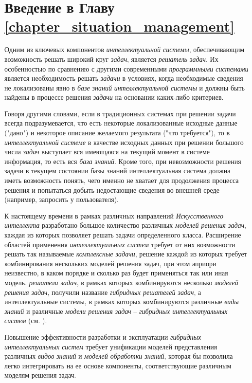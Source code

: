 \section*{Введение в Главу \ref{chapter_situation_management}}

Одним из ключевых компонентов \textit{интеллектуальной системы}, обеспечивающим возможность решать широкий круг \textit{задач}, является \textit{решатель задач}. Их особенностью по сравнению с другими современными \textit{программными системами} является необходимость решать \textit{задачи} в условиях, когда необходимые сведения не локализованы явно в \textit{базе знаний} \textit{интеллектуальной системы} и должны быть найдены в процессе решения \textit{задачи} на основании каких-либо критериев. 

Говоря другими словами, если в традиционных системах при решении задачи всегда подразумевается, что есть некоторые локализованные исходные данные ("дано") и некоторое описание желаемого результата ("что требуется"), то в \textit{интеллектуальной системе} в качестве исходных данных при решении большого числа \textit{задач} выступает вся имеющаяся на текущий момент в системе информация, то есть вся \textit{база знаний}. Кроме того, при невозможности решения задачи в текущем состоянии базы знаний интеллектуальная система должна иметь возможность понять, чего именно не хватает для продолжения процесса решения и попытаться добыть недостающие сведения во внешней среде (например, запросить у пользователя).

К настоящему времени в рамках различных направлений \textit{Искусственного интеллекта} разработано большое количество различных \textit{моделей решения задач}, каждая из которых позволяет решать задачи определенного класса. Расширение областей применения \textit{интеллектуальных систем} требует от них возможности решать так называемые \textit{комплексные задачи}, решение каждой из которых требует комбинирования нескольких моделей решения задач, при этом априори неизвестно, в каком порядке и сколько раз будет применяться так или иная модель. \textit{решатели задач}, в рамках которых комбинируются несколько \textit{моделей решения задач}, получили название \textit{гибридных решателей задач}, а интеллектуальные системы, в рамках которых комбинируются различные \textit{виды знаний} и различные \textit{модели решения задач} -- \textit{гибридных интеллектуальных систем} (см. ).

Повышение эффективности разработки и эксплуатации\textit{ гибридных интеллектуальных систем} требует унификации моделей представления различных \textit{видов знаний} и \textit{моделей обработки знаний}, которая бы позволила легко интегрировать на ее основе компоненты, соответствующие различным моделям решения задач.

